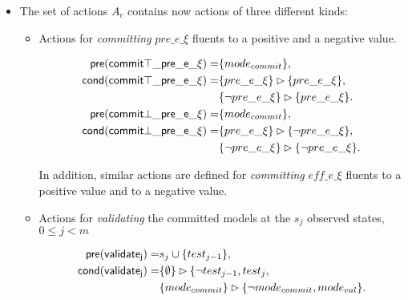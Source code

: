 \documentclass{article}
\newcommand{\pre}{\mathsf{pre}}     %
\newcommand{\cond}{\mathsf{cond}}   %
\begin{document}
\begin{itemize}
      \item The set of actions $A_c$ contains now actions of three different kinds:
\begin{itemize}
      \item Actions for {\em committing} {\small $pre\_e\_\xi$} fluents to a positive and a negative value.
\begin{small}
\begin{align*}
\hspace*{7pt}\pre(\mathsf{commit\top\_pre\_e\_\xi})=&\{mode_{commit}\},\\
\cond(\mathsf{commit\top\_pre\_e\_\xi})=&\{pre\_e\_\xi\}\rhd\{pre\_e\_\xi\},\\
                                    &\{\neg pre\_e\_\xi\}\rhd\{pre\_e\_\xi\}.\\
\hspace*{7pt}\pre(\mathsf{commit\bot\_pre\_e\_\xi})=&\{mode_{commit}\},\\
\cond(\mathsf{commit\bot\_pre\_e\_\xi})=&\{pre\_e\_\xi\}\rhd\{\neg pre\_e\_\xi\},\\
                                    &\{\neg pre\_e\_\xi\}\rhd\{\neg pre\_e\_\xi\}.                                    
\end{align*}
\end{small}
In addition, similar actions are defined for {\em committing} {\small $eff\_e\_\xi$} fluents to a positive value and to a negative value.

      \item Actions for {\em validating} the committed models at the $s_j$ observed states, {\tt\small $0\leq j< m$}
\begin{small}
\begin{align*}
\hspace*{7pt}\pre(\mathsf{validate_{j}})=&s_j\cup\{test_{j-1}\},\\
\cond(\mathsf{validate_{j}})=&\{\emptyset\}\rhd\{\neg test_{j-1}, test_j,\\
                            &\{mode_{commit}\}\rhd\{\neg mode_{commit}, mode_{val}\}.
\end{align*}
\end{small}


\end{itemize}
\end{itemize}
\end{document}

